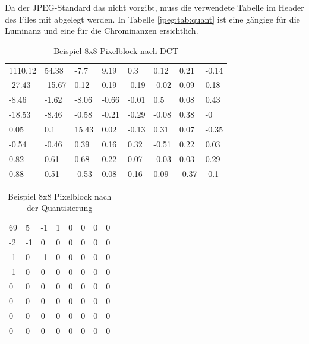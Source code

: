 Da der JPEG-Standard das nicht vorgibt, muss die verwendete Tabelle im Header des Files mit abgelegt werden.
In Tabelle \ref{jpeg:tab:quant} ist eine gängige für die Luminanz und eine für die Chrominanzen ersichtlich.

\begin{table}[t]
    \centering
    \begin{tabular}{llllllll}
        1110.12 & 54.38  & -7.7  & 9.19  & 0.3   & 0.12  & 0.21  & -0.14 \\
        -27.43  & -15.67 & 0.12  & 0.19  & -0.19 & -0.02 & 0.09  & 0.18  \\
        -8.46   & -1.62  & -8.06 & -0.66 & -0.01 & 0.5   & 0.08  & 0.43  \\
        -18.53  & -8.46  & -0.58 & -0.21 & -0.29 & -0.08 & 0.38  & -0    \\
        0.05    & 0.1    & 15.43 & 0.02  & -0.13 & 0.31  & 0.07  & -0.35 \\
        -0.54   & -0.46  & 0.39  & 0.16  & 0.32  & -0.51 & 0.22  & 0.03  \\
        0.82    & 0.61   & 0.68  & 0.22  & 0.07  & -0.03 & 0.03  & 0.29  \\
        0.88    & 0.51   & -0.53 & 0.08  & 0.16  & 0.09  & -0.37 & -0.1 
    \end{tabular}
    \caption{Beispiel 8x8 Pixelblock nach DCT
        \label{jpeg:tab:dctblock}}
\end{table}

\begin{table}[]
    \centering
    \begin{tabular}{llllllll}
        69 & 5  & -1 & 1  & 0  & 0  & 0  & 0 \\
        -2 & -1 & 0  & 0  & 0 & 0 & 0  & 0  \\
        -1 & 0 & -1 & 0 & 0 & 0  & 0  & 0  \\
        -1 & 0 & 0 & 0 & 0 & 0 & 0  & 0 \\
        0  & 0  & 0  & 0  & 0 & 0  & 0  & 0 \\
        0 & 0 & 0  & 0  & 0  & 0 & 0  & 0  \\
        0  & 0  & 0  & 0  & 0  & 0 & 0  & 0  \\
        0  & 0  & 0 & 0  & 0  & 0  & 0 & 0
    \end{tabular}
     \caption{Beispiel 8x8 Pixelblock nach der Quantisierung
        \label{jpeg:tab:quantblock}}
\end{table}

